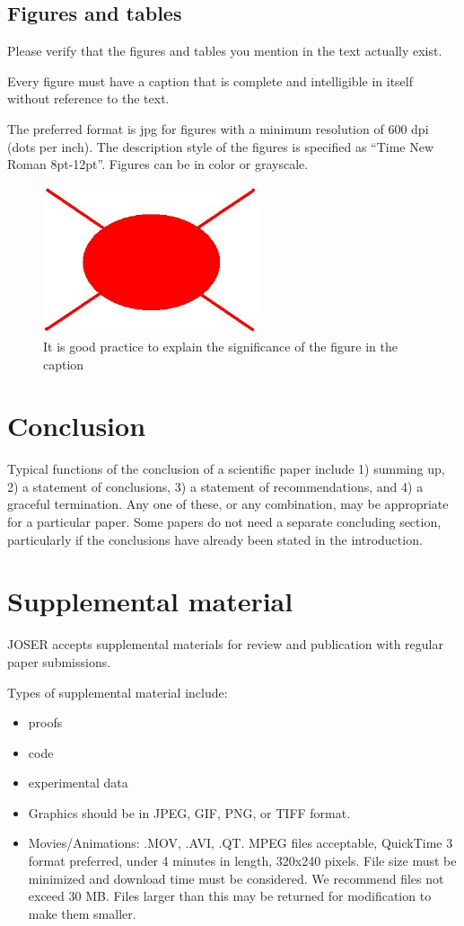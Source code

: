\documentclass[10pt,journal,compsoc]{joser1}
\begin{document}
\subsection{Figures and tables}
Please verify that the figures and tables you mention in the text actually exist.

Every figure must have a caption that is complete and intelligible
in itself without reference to the text.

The preferred format is jpg for figures
with a minimum resolution of 600 dpi (dots per inch).
The description style of the figures is specified as ``Time New
Roman 8pt-12pt''. Figures can be in color or grayscale.

\begin{figure}[!t]
\centering
\includegraphics[width=2.5in]{figure}
\caption{It is good practice to explain the significance
of the figure in the caption}
\label{fig:afigure}
\end{figure}


\section{Conclusion}
Typical functions of the conclusion of a scientific paper include 1)
summing up, 2) a statement of conclusions, 3) a statement of
recommendations, and 4) a graceful termination. Any one of these, or
any combination, may be appropriate for a particular paper. Some
papers do not need a separate concluding section, particularly if
the conclusions have already been stated in the introduction.

\section*{Supplemental material}
JOSER accepts supplemental materials for review and publication with regular paper submissions.

Types of supplemental material include:
\begin{itemize}
    \item proofs
    \item code
    \item experimental data
    \item Graphics should be in JPEG, GIF, PNG, or TIFF format.
    \item Movies/Animations: .MOV, .AVI, .QT. MPEG files acceptable, QuickTime 3 format preferred, under 4 minutes in length, 320x240 pixels. File size must be minimized and download time must be considered. We recommend files not exceed 30 MB. Files larger than this may be returned for modification to make them smaller.
\end{itemize}
\end{document}
